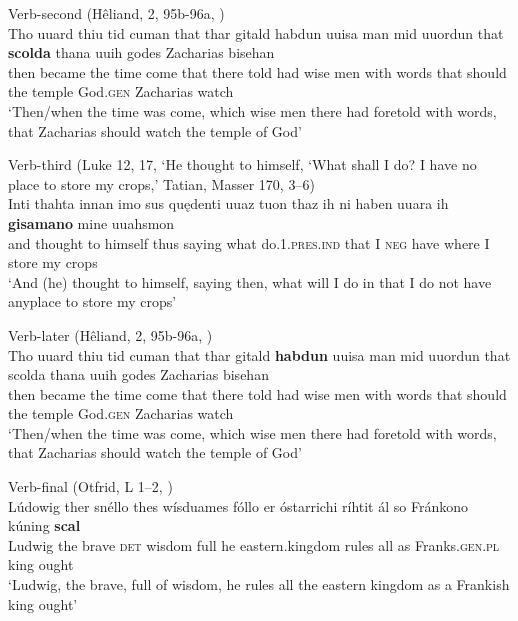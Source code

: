 \ex Verb-second (Hêliand, 2, 95b-96a, \citealt{Sievers1935})\\
\gll Tho  uuard   thiu   tid     cuman  that    thar  gitald   habdun uuisa  man  mid   uuordun  that    \textbf{scolda}  thana   uuih   godes Zacharias  bisehan\\
then   became   the    time  come    that   there   told    had wise     men      with  words          that    should  the    temple   God.\textsc{gen} Zacharias   watch\\
\glt ‘Then/when the time was come, which wise men there had foretold with words, that Zacharias should watch the temple of God’ 

\ex Verb-third (Luke 12, 17, ‘He thought to himself, ‘What shall I do? I have no place to store my crops,’ Tatian, Masser 170, 3--6)\\
\gll Inti  thahta   innan   imo   sus    quędenti  uuaz   tuon thaz  ih   ni   haben  uuara   ih  \textbf{gisamano}   mine  uuahsmon\\
and   thought   to     himself   thus    saying     what  do.\textsc{1.pres.ind} that   I  \textsc{neg}  have   where  I   store     my     crops\\
\glt ‘And (he) thought to himself, saying then, what will I do in that I do not have anyplace to store my crops’ 

\ex Verb-later (Hêliand, 2, 95b-96a, \citealt{Sievers1935})\\
\gll Tho  uuard  thiu    tid    cuman     that   thar   gitald  \textbf{habdun} uuisa  man  mid    uuordun  that    scolda    thana  uuih  godes Zacharias  bisehan\\
then  became   the    time   come  that   there  told   had wise    men    with  words    that    should    the    temple  God.\textsc{gen} Zacharias   watch\\
\glt ‘Then/when the time was come, which wise men there had foretold with words, that Zacharias should watch the temple of God’ 

\ex Verb-final (Otfrid, L 1--2, \citealt{Erdmann1973})\\
\gll Lúdowig  ther   snéllo  thes   wísduames   fóllo er  óstarrichi      ríhtit   ál  so   Fránkono    kúning   \textbf{scal}\\
Ludwig   the   brave  \textsc{det}   wisdom    full he   eastern.kingdom   rules  all  as   Franks.\textsc{gen.pl}  king   ought\\
\glt ‘Ludwig, the brave, full of wisdom, he rules all the eastern kingdom as a Frankish king ought’
    \z
\z

